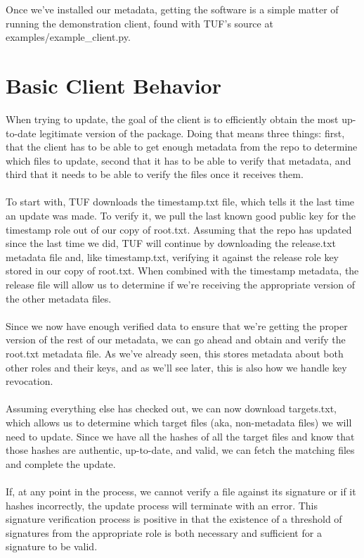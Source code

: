 \documentclass{letter}
\begin{document}


Once we've installed our metadata, getting the software is a simple matter of 
running the demonstration client, found with TUF's source at 
examples/example\_client.py.
\section{Basic Client Behavior}
When trying to update, the goal of the client is to efficiently obtain the most up-to-date
legitimate version of the package. Doing that means three things: first, that 
the client has to be able to get enough metadata from the repo to determine 
which files to update, second that it has to be able to verify that metadata, 
and third that it needs to be able to verify the files once it receives them. 
\\\\
To start with, TUF downloads the timestamp.txt file, which tells it the last 
time an update was made. To verify it, we pull the last known good public key for
the timestamp role out of our copy of root.txt. Assuming that the repo has updated
since the last time we did, TUF will continue by downloading the release.txt 
metadata file and, like timestamp.txt, verifying it against the release role key
stored in our copy of root.txt. When combined with the timestamp metadata, the
release file will allow us to determine if we're receiving the appropriate version 
of the other metadata files.
\\\\
Since we now have enough verified data to ensure that we're getting the proper
version of the rest of our metadata, we can go ahead and obtain and verify the 
root.txt metadata file. As we've already seen, this stores metadata about both 
other roles and their keys, and as we'll see later, this is also how we handle 
key revocation.
\\\\
Assuming everything else has checked out, we can now download targets.txt, which 
allows us to determine which target files (aka, non-metadata files) we will need
to update. Since we have all the hashes of all the target files and know that
those hashes are authentic, up-to-date, and valid, we can fetch the matching files
and complete the update.
\\\\
If, at any point in the process, we cannot verify a file against its signature
or if it hashes incorrectly, the update process will terminate with an error.
This signature verification process is positive in that the existence of a
threshold of signatures from the appropriate role is both necessary and sufficient
for a signature to be valid.
\end{document}

